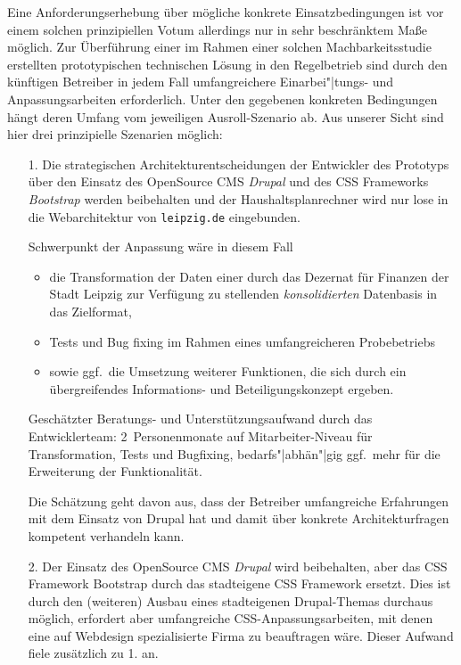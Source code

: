 \documentclass[11pt,a4paper,twoside]{article}
\begin{document}
Eine Anforderungserhebung über mögliche konkrete Einsatzbedingungen ist vor
einem solchen prinzipiellen Votum allerdings nur in sehr beschränktem Maße
möglich.  Zur Überführung einer im Rahmen einer solchen Machbarkeitsstudie
erstellten prototypischen technischen Lösung in den Regelbetrieb sind durch
den künftigen Betreiber in jedem Fall umfangreichere Einarbei"|tungs- und
Anpassungsarbeiten erforderlich. Unter den gegebenen konkreten Bedingungen
hängt deren Umfang vom jeweiligen Ausroll-Szenario ab. Aus unserer Sicht sind
hier drei prinzipielle Szenarien möglich:
\begin{itemize}
\item[1.] Die strategischen Architekturentscheidungen der Entwickler des
  Prototyps über den Einsatz des OpenSource CMS \emph{Drupal} und des CSS
  Frameworks \emph{Bootstrap} werden beibehalten und der Haushaltsplanrechner
  wird nur lose in die Webarchitektur von \texttt{leipzig.de} eingebunden.

  Schwerpunkt der Anpassung wäre in diesem Fall
  \begin{itemize}
  \item die Transformation der Daten einer durch das Dezernat für Finanzen der
    Stadt Leipzig zur Verfügung zu stellenden \emph{konsolidierten} Datenbasis
    in das Zielformat,
  \item Tests und Bug fixing im Rahmen eines umfangreicheren Probebetriebs
  \item sowie ggf.\ die Umsetzung weiterer Funktionen, die sich durch ein
    übergreifendes Informations- und Beteiligungskonzept ergeben.
  \end{itemize}
  Geschätzter Beratungs- und Unterstützungsaufwand durch das Entwicklerteam:
  2~Personenmonate auf Mitarbeiter-Niveau für Transformation, Tests und
  Bugfixing, bedarfs"|abhän"|gig ggf.\ mehr für die Erweiterung der
  Funktionalität.

  Die Schätzung geht davon aus, dass der Betreiber umfangreiche Erfahrungen mit
  dem Einsatz von Drupal hat und damit über konkrete Architekturfragen
  kompetent verhandeln kann. 
\item [2.] Der Einsatz des OpenSource CMS \emph{Drupal} wird beibehalten, aber
  das CSS Framework Bootstrap durch das stadteigene CSS Framework ersetzt. Dies
  ist durch den (weiteren) Ausbau eines stadteigenen Drupal-Themas durchaus
  möglich, erfordert aber umfangreiche CSS-Anpassungsarbeiten, mit denen eine
  auf Webdesign spezialisierte Firma zu beauftragen wäre.  Dieser Aufwand fiele
  zusätzlich zu 1. an.


\end{itemize}
\end{document}
